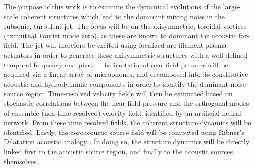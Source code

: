 The purpose of this work is to examine the dynamical evolutions of the large-scale coherent structures which lead to the dominant mixing noise in the subsonic, turbulent jet.
The focus will be on the axisymmetric, toroidal vortices (azimuthal Fourier mode zero), as these are known to dominant the acoustic far-field.
The jet will therefore be excited using localized arc-filament plasma actuators in order to generate these axisymmetric structures with a well-defined temporal frequency and phase.
The irrotational near-field pressure will be acquired via a linear array of microphones, and decomposed into its constitutive acoustic and hydrodynamic components in order to identify the dominant noise source region.
Time-resolved velocity fields will then be estimated based on stochastic correlations between the near-field pressure and the orthogonal modes of ensemble (non-time-resolved) velocity field, identified by an artificial neural network.
From these time resolved fields, the coherent structure dynamics will be identified.
Lastly, the aeroacoustic source field will be computed using Ribner's Dilatation acoustic analogy \citep{Ribner1962}.
In doing so, the structure dynamics will be directly linked first to the acoustic source region, and finally to the acoustic sources themselves.